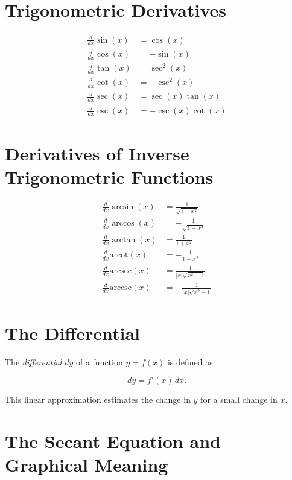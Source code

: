 \section{Trigonometric Derivatives}

\begin{align*}
    \frac{d}{dx} \sin(x) &= \cos (x) \\
    \frac{d}{dx} \cos(x) &= -\sin(x) \\
    \frac{d}{dx} \tan(x) &= \sec^2(x) \\
    \frac{d}{dx} \cot(x) &= -\csc^2(x) \\
    \frac{d}{dx} \sec(x) &=  \sec(x)\tan(x) \\
    \frac{d}{dx} \csc(x) &= -\csc(x) \cot(x)
\end{align*}

\section{Derivatives of Inverse Trigonometric Functions}

\begin{align*}
    \frac{d}{dx} \arcsin(x) &= \frac{1}{\sqrt{1 - x^2}} \\
    \frac{d}{dx} \arccos(x) &= -\frac{1}{\sqrt{1 - x^2}} \\
    \frac{d}{dx} \arctan (x) &= \frac{1}{1 + x^2} \\
    \frac{d}{dx} \mathrm{arcot}(x) &= -\frac{1}{1 + x^2} \\
    \frac{d}{dx} \mathrm{arcsec}(x) &= \frac{1}{|x|\sqrt{x^2 - 1}} \\
    \frac{d}{dx} \mathrm{arccsc}(x) &= -\frac{1}{|x|\sqrt{x^2 - 1}}
\end{align*}

\section{The Differential}

The \emph{differential} \(dy\) of a function \(y = f(x)\) is defined as:

\[
    dy = f'(x) \, dx.
\]

This linear approximation estimates the change in \(y\) for a small change in \(x\).

\section{The Secant Equation and Graphical Meaning}

